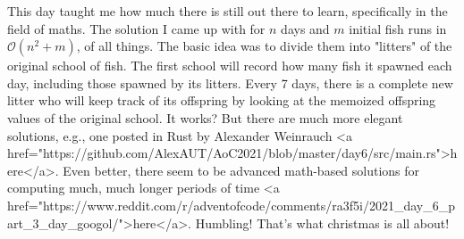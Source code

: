 This day taught me how much there is still out there to learn, specifically in the field of maths. The solution I came up with for $n$ days and $m$ initial fish runs in $\mathcal{O}(n^2 + m)$, of all things. The basic idea was to divide them into "litters" of the original school of fish. The first school will record how many fish it spawned each day, including those spawned by its litters. Every 7 days, there is a complete new litter who will keep track of its offspring by looking at the memoized offspring values of the original school. It works? But there are much more elegant solutions, e.g., one posted in Rust by Alexander Weinrauch <a href="https://github.com/AlexAUT/AoC2021/blob/master/day6/src/main.rs">here</a>. Even better, there seem to be advanced math-based solutions for computing much, much longer periods of time <a href="https://www.reddit.com/r/adventofcode/comments/ra3f5i/2021_day_6_part_3_day_googol/">here</a>. Humbling! That's what christmas is all about! 🎄